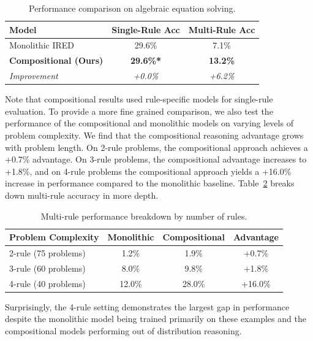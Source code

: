 \documentclass{article}
\begin{document}
\begin{table}[h]
\centering
\caption{Performance comparison on algebraic equation solving.}
\label{tab:main_results}
\begin{tabular}{lcc}
\toprule
Model & Single-Rule Acc & Multi-Rule Acc \\
\midrule
Monolithic IRED & 29.6\% & 7.1\% \\
\textbf{Compositional (Ours)} & \textbf{29.6\%*} & \textbf{13.2\%} \\
\midrule
\textit{Improvement} & \textit{+0.0\%} & \textit{+6.2\%} \\
\bottomrule
\end{tabular}
\vspace{0.5em}
\end{table}

Note that compositional results used rule-specific models for single-rule evaluation. To provide a more fine grained comparison, we also test the performance of the compositional and monolithic models on varying levels of problem complexity. We find that the compositional reasoning advantage grows with problem length. On 2-rule problems, the compositional approach achieves a +0.7\% advantage. On 3-rule problems, the compositional advantage increases to +1.8\%, and on 4-rule problems the compositional approach yields a +16.0\% increase in performance compared to the monolithic baseline. Table~\ref{tab:breakdown} breaks down multi-rule accuracy in more depth.

\begin{table}[h]
\centering
\caption{Multi-rule performance breakdown by number of rules.}
\label{tab:breakdown}
\begin{tabular}{lccc}
\toprule
Problem Complexity & Monolithic & \textbf{Compositional} & Advantage \\
\midrule
2-rule (75 problems) & 1.2\% & 1.9\% & +0.7\% \\
3-rule (60 problems) & 8.0\% & 9.8\% & +1.8\% \\
4-rule (40 problems) & 12.0\% & 28.0\% & +16.0\% \\
\bottomrule
\end{tabular}
\vspace{0.5em}
\footnotesize{}
\end{table}

Surprisingly, the 4-rule setting demonstrates the largest gap in performance despite the monolithic model being trained primarily on these examples and the compositional models performing out of distribution reasoning.
\end{document}
